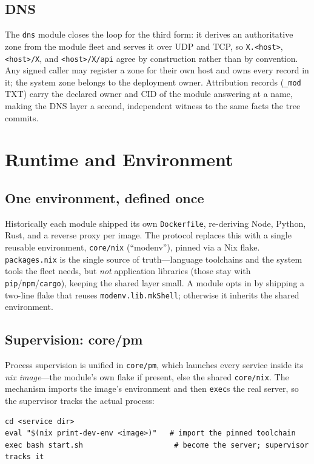 \documentclass[11pt,a4paper]{article}
\begin{document}
\subsection{DNS}

The \texttt{dns} module closes the loop for the third form: it derives an
authoritative zone from the module fleet and serves it over UDP and TCP, so
\texttt{X.<host>}, \texttt{<host>/X}, and \texttt{<host>/X/api} agree by
construction rather than by convention. Any signed caller may register a zone
for their own host and owns every record in it; the system zone belongs to the
deployment owner. Attribution records (\texttt{\_mod} TXT) carry the declared
owner and CID of the module answering at a name, making the DNS layer a second,
independent witness to the same facts the tree commits.

\section{Runtime and Environment}

\subsection{One environment, defined once}

Historically each module shipped its own \texttt{Dockerfile}, re-deriving Node,
Python, Rust, and a reverse proxy per image. The protocol replaces this with a
single reusable environment, \texttt{core/nix} (``modenv''), pinned via a Nix
flake. \texttt{packages.nix} is the single source of truth---language toolchains
and the system tools the fleet needs, but \emph{not} application libraries
(those stay with \texttt{pip}/\texttt{npm}/\texttt{cargo}), keeping the shared
layer small. A module opts in by shipping a two-line flake that reuses
\texttt{modenv.lib.mkShell}; otherwise it inherits the shared environment.

\subsection{Supervision: core/pm}

Process supervision is unified in \texttt{core/pm}, which launches every service
inside its \emph{nix image}---the module's own flake if present, else the shared
\texttt{core/nix}. The mechanism imports the image's environment and then
\texttt{exec}s the real server, so the supervisor tracks the actual process:

\begin{lstlisting}[style=python]
cd <service dir>
eval "$(nix print-dev-env <image>)"   # import the pinned toolchain
exec bash start.sh                     # become the server; supervisor tracks it
\end{lstlisting}
\end{document}
